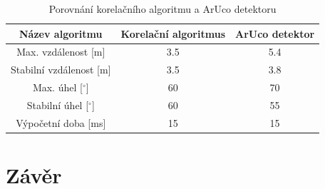 \documentclass[twoside]{ctuthesis}
\theoremstyle{plain}
\theoremstyle{definition}
\theoremstyle{note}
\begin{document}
\begin{table}[hbt]
	\centering
	\caption{Porovnání korelačního algoritmu a ArUco detektoru}
	\label{porovnani}
	\begin{tabular}{|c|c|c|}
		\hline
		Název algoritmu              & Korelační algoritmus & ArUco detektor \\ \hline
		Max. vzdálenost {[}m{]}      & 3.5                 & 5.4           \\ \hline
		Stabilní vzdálenost {[}m{]}  & 3.5                 & 3.8           \\ \hline
		Max. úhel {[}$^\circ${]}     & 60                   & 70             \\ \hline
		Stabilní úhel {[}$^\circ${]} & 60                   & 55             \\ \hline
		Výpočetní doba {[}ms{]}      & 15                   & 15             \\ \hline
	\end{tabular}
\end{table}

\chapter{Závěr}
\appendix

\printindex

%
%
\end{document}
